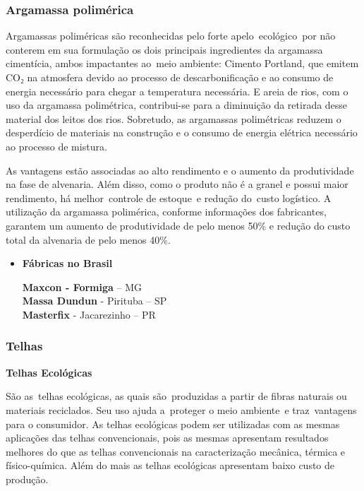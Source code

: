 \subsubsection{Argamassa polimérica}

	Argamassas poliméricas são reconhecidas pelo forte apelo ecológico por não conterem em sua formulação os dois principais ingredientes da argamassa cimentícia, ambos impactantes ao meio ambiente: Cimento Portland, que emitem CO₂ na atmosfera devido ao processo de descarbonificação e ao consumo de energia necessário para chegar a temperatura necessária. E areia de rios, com o uso da argamassa polimétrica, contribui-se para a diminuição da retirada desse material dos leitos dos rios. Sobretudo, as argamassas polimétricas reduzem o desperdício de materiais na construção e o consumo de energia elétrica necessário ao processo de mistura.\cite{Angulo2000}\cite{Portland1980}


	As vantagens estão associadas ao alto rendimento e o aumento da produtividade na fase de alvenaria. Além disso, como o produto não é a granel e possui maior rendimento, há melhor controle de estoque e redução do custo logístico. A utilização da argamassa polimérica, conforme informações dos fabricantes, garantem um aumento de produtividade de pelo menos 50\% e redução do custo total da alvenaria de pelo menos 40\%.

\begin{itemize}
\item \textbf{Fábricas no Brasil}

\textbf{Maxcon - Formiga} – MG\\
\textbf{Massa Dundun} - Pirituba – SP\\
\textbf{Masterfix} - Jacarezinho – PR
\end{itemize}

\subsubsection{Telhas}

\textbf{Telhas Ecológicas}

	São as telhas ecológicas, as quais são produzidas a partir de fibras naturais ou materiais reciclados. Seu uso ajuda a proteger o meio ambiente e traz vantagens para o consumidor. As telhas ecológicas podem ser utilizadas com as mesmas aplicações das telhas convencionais, pois as mesmas apresentam resultados melhores do que as telhas convencionais na caracterização mecânica, térmica e físico-química. Além do mais as telhas ecológicas apresentam baixo custo de produção.\\


